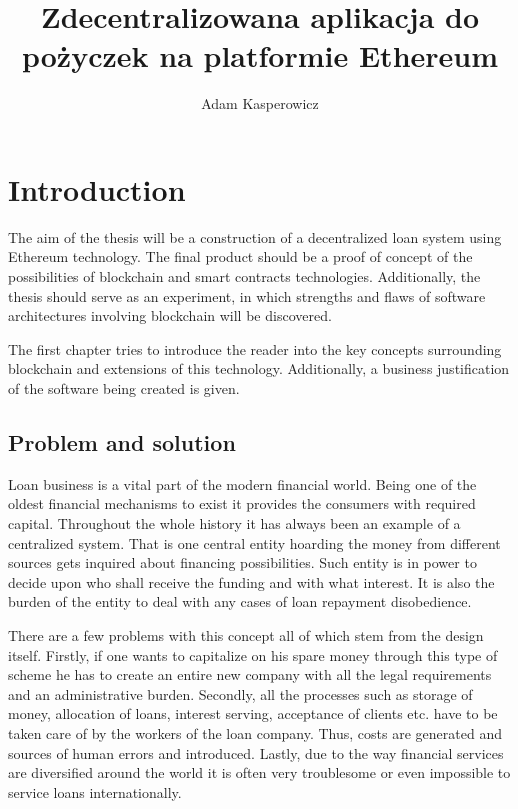 \documentclass[a4paper,12pt,twoside,openany]{report}
\title{Zdecentralizowana aplikacja do pożyczek na platformie Ethereum}
\author{Adam Kasperowicz}
\begin{document}
\maketitle

\chapter{Introduction}
The aim of the thesis will be a construction of a decentralized loan system using Ethereum
technology. The final product should be a proof of concept of the possibilities of blockchain and smart contracts technologies. Additionally, the thesis should serve as an experiment, in which strengths and flaws of software architectures involving blockchain will be discovered.

The first chapter tries to introduce the reader into the key concepts surrounding blockchain and extensions of this technology. Additionally, a business justification of the software being created is given.
 
\section{Problem and solution}
Loan business is a vital part of the modern financial world. Being one of the oldest financial mechanisms to exist it provides the consumers with required capital. Throughout the whole history it has always been an example of a centralized system. That is one central entity hoarding the money from different sources gets inquired about financing possibilities. Such entity is in power to decide upon who shall receive the funding and with what interest. It is also the burden of the entity to deal with any cases of loan repayment disobedience.

There are a few problems with this concept all of which stem from the design itself. Firstly, if one wants to capitalize on his spare money through this type of scheme he has to create an entire new company with all the legal requirements and an administrative burden. Secondly, all the processes such as storage of money, allocation of loans, interest serving, acceptance of clients etc. have to be taken care of by the workers of the loan company. Thus, costs are generated and sources of human errors and introduced. Lastly, due to the way financial services are diversified around the world it is often very troublesome or even impossible to service loans internationally.
\end{document}
